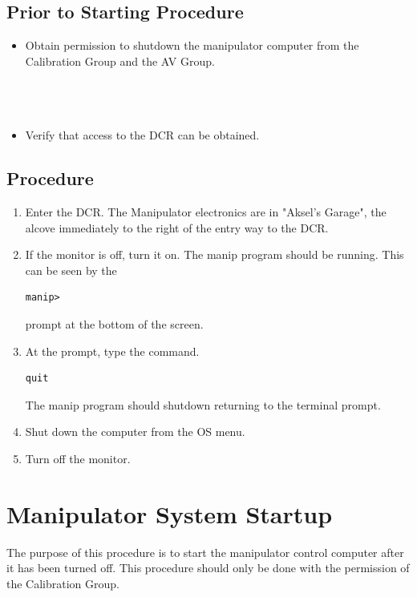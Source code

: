 \documentclass[11pt]{article}
\begin{document}
\subsection{Prior to Starting Procedure}
\begin{itemize}
\item Obtain permission to shutdown the manipulator computer from the Calibration Group and the AV Group.
\\ \\ \\ \\
\item Verify that access to the DCR can be obtained.
\end{itemize}

\subsection{Procedure}
\begin{enumerate}
\item \CheckBox[name=p1]{} Enter the DCR. The Manipulator electronics are in "Aksel's Garage", the alcove immediately to the right of the entry way to the DCR.
\item \CheckBox[name=p2]{} If the monitor is off, turn it on. The manip program should be running. This can be seen by the 
\begin{verbatim}
manip>
\end{verbatim}
prompt at the bottom of the screen.
\item \CheckBox[name=p3]{} At the prompt, type the command.
\begin{verbatim}
quit
\end{verbatim}
The manip program should shutdown returning to the terminal prompt.
\item \CheckBox[name=p4]{} Shut down the computer from the OS menu.
\item \CheckBox[name=p5]{} Turn off the monitor.
\end{enumerate}
\section{Manipulator System Startup}

The purpose of this procedure is to start the manipulator control computer after it has been turned off. This procedure should only be done with the permission of the Calibration Group.
\end{document}
